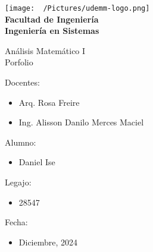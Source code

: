 \begin{center}
  \vspace*{.5cm}
  \texttt{[image: ~/Pictures/udemm-logo.png]}\\
  \vspace{.2cm}
  \Large
  \textbf{Facultad de Ingeniería}\\
  \textbf{Ingeniería en Sistemas}\\
  \vspace{2cm}

  \Huge
  Análisis Matemático I \\
  Porfolio \\
  \vfill

  \raggedright
  \Large
  Docentes:
  \begin{itemize}
    \item[] Arq. Rosa Freire\\
    \item[] Ing. Alisson Danilo Merces Maciel\\
  \end{itemize}
  Alumno:
  \begin{itemize}
    \item[] Daniel Ise
  \end{itemize}
  Legajo:
  \begin{itemize}
    \item[] 28547
  \end{itemize}
  Fecha:
  \begin{itemize}
    \item[] Diciembre, 2024
  \end{itemize}
\end{center}
